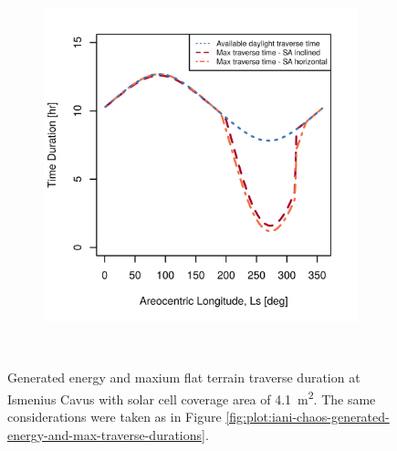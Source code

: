 \begin{figure}[h]
\begin{subfigure}[t]{\subfigureWidth}
        \includegraphics[height=\graphicsHeight]{sections/power-system-design/solar-array/plots/ismeniuscavus-75w-max-traverse-durations-for-solar-cell-coverage-area-41m2.png}
		\label{fig:plot:sub:ismenius-cavus-max-traverse-durations}
	\end{subfigure}\\[0.8ex]
    \caption[Generated energy and maxium flat terrain traverse durations at Ismenius Cavus]
            {Generated energy and maxium flat terrain traverse duration at Ismenius Cavus with solar cell coverage area of \SI{4.1}{m^{2}}. The same considerations were taken as in Figure \ref{fig:plot:iani-chaos-generated-energy-and-max-traverse-durations}.}
    \label{fig:plot:ismenius-cavus-generated-energy-and-max-traverse-durations}
\vspace{-2ex}
\end{figure}

